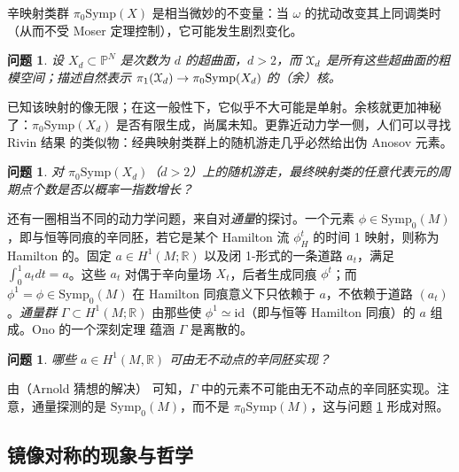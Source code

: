 \documentclass[11pt,a4paper]{article}
\numberwithin{equation}{section}
\newtheorem{Question}[thm]{问题}
\newcommand{\bR}{\mathbb{R}}
\newcommand{\bQ}{\mathbb{Q}}
\newcommand{\bP}{\mathbb{P}}
\newcommand{\scrX}{\EuScript{X}}
\newcommand{\Symp}{\mathrm{Symp}}
\newcommand{\id}{\mathrm{id}}
\begin{document}
辛映射类群 $\pi_0 \Symp(X)$ 是相当微妙的不变量：当 $\omega$ 的扰动改变其上同调类时（从而不受 Moser 定理控制），它可能发生剧烈变化。

\begin{Question}\label{Question:Monodromy} 设 $X_d \subset \bP^N$ 是次数为 $d$ 的超曲面，$d>2$，而 $\scrX_d$ 是所有这些超曲面的粗模空间；描述自然表示 $\pi_1(\scrX_d) \rightarrow \pi_0\Symp(X_d)$ 的（余）核。 \end{Question}

已知该映射的像无限；在这一般性下，它似乎不大可能是单射。余核就更加神秘了：$\pi_0\Symp(X_d)$ 是否有限生成，尚属未知。更靠近动力学一侧，人们可以寻找 Rivin 结果 \cite{Rivin} 的类似物：经典映射类群上的随机游走几乎必然给出伪 Anosov 元素。

\begin{Question} \label{Question:RandomWalk} 对 $\pi_0\Symp(X_d)$（$d>2$）上的随机游走，最终映射类的任意代表元的周期点个数是否以概率一指数增长？ \end{Question}

还有一圈相当不同的动力学问题，来自对\emph{通量}的探讨。一个元素 $\phi \in \Symp_0(M)$，即与恒等同痕的辛同胚，若它是某个 Hamilton 流 $\phi_H^t$ 的时间 1 映射，则称为 Hamilton 的。固定 $a\in H^1(M;\bR)$ 以及闭 1-形式的一条道路 $a_t$，满足 $\int_0^1 a_t dt = a$。这些 $a_t$ 对偶于辛向量场 $X_t$，后者生成同痕 $\phi^t$；而 $\phi^1 = \phi \in \Symp_0(M)$ 在 Hamilton 同痕意义下只依赖于 $a$，不依赖于道路 $(a_t)$。\emph{通量群} $\Gamma \subset H^1(M;\bR)$ 由那些使 $\phi^1 \simeq \id$（即与恒等 Hamilton 同痕）的 $a$ 组成。Ono 的一个深刻定理 \cite{Ono} 蕴涵 $\Gamma$ 是离散的。

\begin{Question} 哪些 $a\in H^1(M,\bR)$ 可由无不动点的辛同胚实现？ \end{Question}


由（Arnold 猜想的解决）\cite{FOno, LiuTian} 可知，$\Gamma$ 中的元素不可能由无不动点的辛同胚实现。注意，通量探测的是 $\Symp_0(M)$，而不是 $\pi_0 \Symp(M)$，这与问题 \ref{Question:RandomWalk} 形成对照。

\subsection{镜像对称的现象与哲学}\label{Sec:Mirror}
\end{document}
